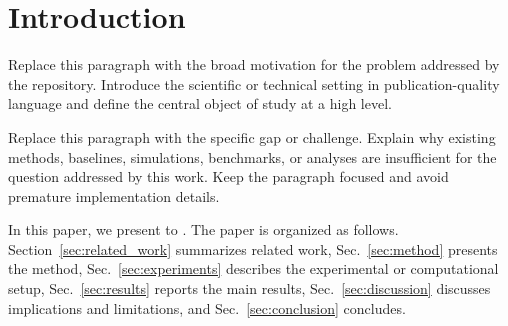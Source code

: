 \section{Introduction}
\label{sec:introduction}

Replace this paragraph with the broad motivation for the problem addressed by the repository. Introduce the scientific or technical setting in publication-quality language and define the central object of study at a high level.

Replace this paragraph with the specific gap or challenge. Explain why existing methods, baselines, simulations, benchmarks, or analyses are insufficient for the question addressed by this work. Keep the paragraph focused and avoid premature implementation details.

In this paper, we present  to . The paper is organized as follows. Section~\ref{sec:related_work} summarizes related work, Sec.~\ref{sec:method} presents the method, Sec.~\ref{sec:experiments} describes the experimental or computational setup, Sec.~\ref{sec:results} reports the main results, Sec.~\ref{sec:discussion} discusses implications and limitations, and Sec.~\ref{sec:conclusion} concludes.
